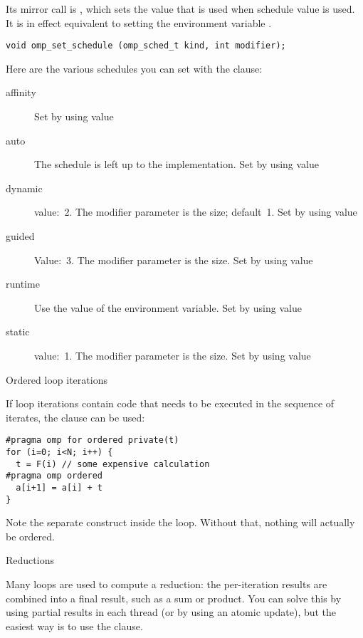 Its mirror call is , which sets the
value that is used when schedule value  is used. It is in
effect equivalent to setting the environment variable
.
\begin{verbatim}
void omp_set_schedule (omp_sched_t kind, int modifier);
\end{verbatim}

Here are the various schedules you can set with the
 clause:
\begin{description}
  \item[affinity] Set by using value  
  \item[auto] The schedule is left up to the implementation. Set by
    using value 
  \item[dynamic] value:~2. The modifier parameter is the
     size; default~1. Set by using value
  \item[guided] Value:~3. The modifier parameter is the
     size. Set by using value
  \item[runtime] Use the value of the 
    environment variable. Set by using value
  \item[static] value:~1. The modifier parameter is the  size. Set by using value  
\end{description}

 {Ordered loop iterations}

If loop iterations contain code that needs to be executed in the sequence of iterates,
the  clause can be used:
\begin{verbatim}
#pragma omp for ordered private(t)
for (i=0; i<N; i++) {
  t = F(i) // some expensive calculation
#pragma omp ordered
  a[i+1] = a[i] + t
}
\end{verbatim}
Note the separate  construct inside the loop. Without that, nothing
will actually be ordered.

 {Reductions}

Many loops are used to compute a reduction: the per-iteration
results are combined into a final result, such as a sum
or product. You can solve this by using partial results
in each thread (or by using an atomic update), but the easiest
way is to use the  clause.

